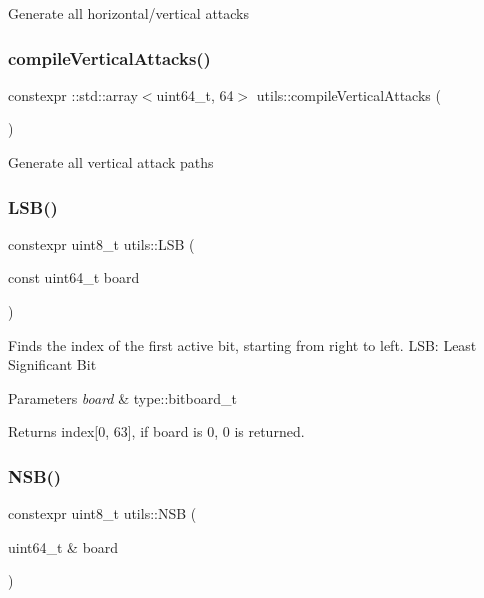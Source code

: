 Generate all horizontal/vertical attacks \mbox{\label{namespaceutils_ab4db5d05b597a157948bf348fc6184ad}} 
\subsubsection{\texorpdfstring{compile\+Vertical\+Attacks()}{compileVerticalAttacks()}}
{\footnotesize\ttfamily constexpr \+::std\+::array$<$uint64\+\_\+t, 64$>$ utils\+::compile\+Vertical\+Attacks (\begin{DoxyParamCaption}{ }\end{DoxyParamCaption})}

Generate all vertical attack paths \mbox{\label{namespaceutils_aa2421ac142f51f3a3f99aefb9ee80661}} 
\subsubsection{\texorpdfstring{L\+S\+B()}{LSB()}}
{\footnotesize\ttfamily constexpr uint8\+\_\+t utils\+::\+L\+SB (\begin{DoxyParamCaption}\item[{const uint64\+\_\+t}]{board }\end{DoxyParamCaption})}

Finds the index of the first active bit, starting from right to left. L\+SB\+: Least Significant Bit


\begin{DoxyParams}{Parameters}
{\em board} & type\+::bitboard\+\_\+t \\
\hline
\end{DoxyParams}
\begin{DoxyReturn}{Returns}
index\mbox{[}0, 63\mbox{]}, if board is 0, 0 is returned. 
\end{DoxyReturn}
\mbox{\label{namespaceutils_aa9a43407479c837a168958d3a9e79540}} 
\subsubsection{\texorpdfstring{N\+S\+B()}{NSB()}}
{\footnotesize\ttfamily constexpr uint8\+\_\+t utils\+::\+N\+SB (\begin{DoxyParamCaption}\item[{uint64\+\_\+t \&}]{board }\end{DoxyParamCaption})}

